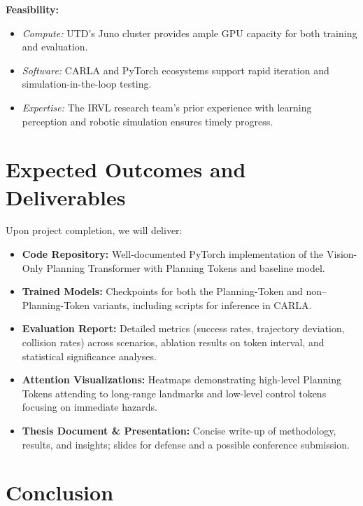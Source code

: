 \documentclass[11pt,a4paper]{article}
\begin{document}
\vspace{1em}

\noindent\textbf{Feasibility:}
\begin{itemize}[nosep]
    \item \emph{Compute:} UTD’s Juno cluster provides ample GPU capacity for both training and evaluation.
    \item \emph{Software:} CARLA and PyTorch ecosystems support rapid iteration and simulation-in-the-loop testing.
    \item \emph{Expertise:} The IRVL research team's prior experience with learning perception and robotic simulation ensures timely progress.
\end{itemize}


\section*{Expected Outcomes and Deliverables}
Upon project completion, we will deliver:

\begin{itemize}
    \item \textbf{Code Repository:} Well-documented PyTorch implementation of the Vision-Only Planning Transformer with Planning Tokens and baseline model.
    \item \textbf{Trained Models:} Checkpoints for both the Planning-Token and non–Planning-Token variants, including scripts for inference in CARLA.
    \item \textbf{Evaluation Report:} Detailed metrics (success rates, trajectory deviation, collision rates) across scenarios, ablation results on token interval, and statistical significance analyses.
    \item \textbf{Attention Visualizations:} Heatmaps demonstrating high-level Planning Tokens attending to long-range landmarks and low-level control tokens focusing on immediate hazards.
    \item \textbf{Thesis Document \& Presentation:} Concise write-up of methodology, results, and insights; slides for defense and a possible conference submission.
\end{itemize}

\section*{Conclusion}
\end{document}
